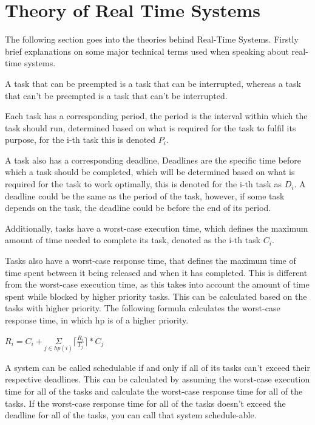 \section{Theory of Real Time Systems}
The following section goes into the theories behind Real-Time Systems. Firstly brief explanations on some major technical terms used when speaking about real-time systems. 

A task that can be preempted is a task that can be interrupted, whereas a task that can't be preempted is a task that can't be interrupted.

Each task has a corresponding period, the period is the interval within which the task should run, determined based on what is required for the task to fulfil its purpose, for the i-th task this is denoted $P_{i}$.


A task also has a corresponding deadline, Deadlines are the specific time before which a task should be completed, which will be determined based on what is required for the task to work optimally, this is denoted for the i-th task as $ D_{i} $. A deadline could be the same as the period of the task, however, if some task depends on the task, the deadline could be before the end of its period. 

Additionally, tasks have a worst-case execution time, which defines the maximum amount of time needed to complete its task, denoted as the i-th task $C_{i}$.

Tasks also have a worst-case response time, that defines the maximum time of time spent between it being released and when it has completed. This is different from the worst-case execution time, as this takes into account the amount of time spent while blocked by higher priority tasks. This can be calculated based on the tasks with higher priority. The following formula calculates the worst-case response time, in which hp is of a higher priority.

$R_{i} = C_{i} + \underset{j\in hp(i)}{\Sigma} \lceil\frac{R_{i}}{T_{j}}\rceil*C_{j} $

A system can be called schedulable if and only if all of its tasks can't exceed their respective deadlines. This can be calculated by assuming the worst-case execution time for all of the tasks and calculate the worst-case response time for all of the tasks. If the worst-case response time for all of the tasks doesn't exceed the deadline for all of the tasks, you can call that system schedule-able.

